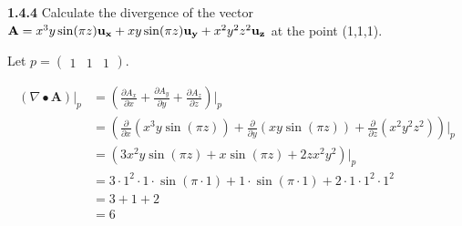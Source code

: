 \documentclass{article}
\begin{document}
\textbf{1.4.4} Calculate the divergence of the vector $\mathbf{A} = x^3 y\sin(\pi z)\mathbf{u_x} \\ + xy\sin(\pi
	z)\mathbf{u_y} + x^2 y^2 z^2 \mathbf{u_z}$ at the point (1,1,1).

\vspace{24pt}

Let $p = \begin{pmatrix} 1 & 1 & 1 \end{pmatrix}$.

\begin{equation*}
	\begin{split}
		(\nabla \bullet \mathbf{A})\rvert_{p} & = \left(\frac{\partial A_x}{\partial x} + \frac{\partial A_y}{\partial y} + \frac{\partial A_z}{\partial z}\right)\biggr\rvert_{p} \\
		& = \left(\frac{\partial}{\partial x}(x^3 y\sin(\pi z)) + \frac{\partial}{\partial y}(xy\sin(\pi z)) + \frac{\partial}{\partial z}(x^2 y^2 z^2)\right)\biggr\rvert_{p} \\
		& = (3x^2 y\sin(\pi z) + x\sin(\pi z) + 2zx^2 y^2)\rvert_{p} \\
		& = 3 \cdot 1^2 \cdot 1 \cdot \sin(\pi \cdot 1) + 1 \cdot \sin(\pi \cdot 1) + 2 \cdot 1 \cdot 1^2 \cdot 1^2 \\
		& = 3 + 1 + 2 \\
		& = 6
	\end{split}
\end{equation*}
\end{document}
